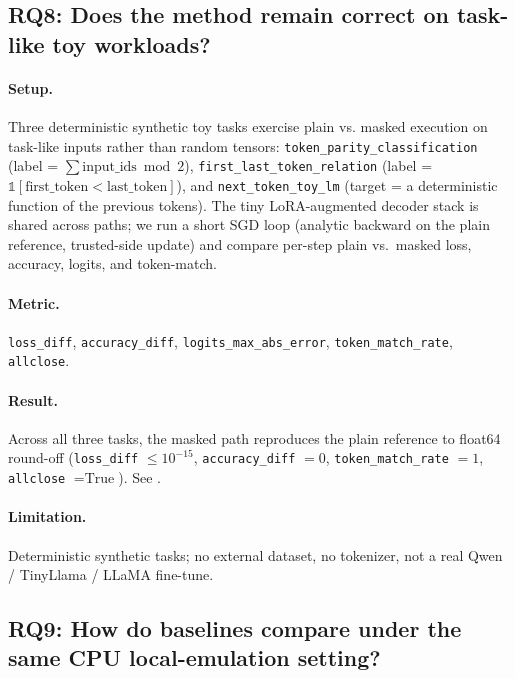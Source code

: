 

\subsection{RQ8: Does the method remain correct on task-like toy workloads?}
\label{sec:eval:rq8}
\paragraph{Setup.} Three deterministic synthetic toy tasks exercise plain vs. masked execution on task-like inputs rather than random tensors: \texttt{token\_parity\_classification} (label = $\sum \text{input\_ids} \bmod 2$), \texttt{first\_last\_token\_relation} (label = $\mathbb{1}[\text{first\_token} < \text{last\_token}]$), and \texttt{next\_token\_toy\_lm} (target = a deterministic function of the previous tokens). The tiny LoRA-augmented decoder stack is shared across paths; we run a short SGD loop (analytic backward on the plain reference, trusted-side update) and compare per-step plain vs.\ masked loss, accuracy, logits, and token-match.

\paragraph{Metric.} \texttt{loss\_diff}, \texttt{accuracy\_diff}, \texttt{logits\_max\_abs\_error}, \texttt{token\_match\_rate}, \texttt{allclose}.

\paragraph{Result.} Across all three tasks, the masked path reproduces the plain reference to float64 round-off (\texttt{loss\_diff} $\leq 10^{-15}$, \texttt{accuracy\_diff} $= 0$, \texttt{token\_match\_rate} $= 1$, \texttt{allclose} $= \text{True}$). See .

\paragraph{Limitation.} Deterministic synthetic tasks; no external dataset, no tokenizer, not a real Qwen / TinyLlama / LLaMA fine-tune.



\subsection{RQ9: How do baselines compare under the same CPU local-emulation setting?}
\label{sec:eval:rq9}
